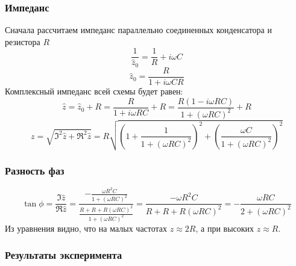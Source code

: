 \subsubsection{Импеданс}
Сначала рассчитаем импеданс параллельно соединенных конденсатора и резистора $R$
\begin{equation}
	\frac{1}{\hat{z}_0}=\frac{1}{R}+i\omega C
\end{equation}
\begin{equation}
	\hat{z}_0=\frac{R}{1+i \omega CR}
\end{equation}
Комплексный импеданс всей схемы будет равен:
\begin{equation}
	\hat{z}=\hat{z}_0+R=\frac{R}{1+i \omega RC}+R=
	\frac{R(1-i \omega RC)}{1+(\omega RC)^2}+R
\end{equation}
\begin{equation}
	z=\sqrt{\Im^2\hat{z}+\Re^2\hat{z}}=
	R\sqrt{
		\left(
		1+\frac{1}{1+(\omega RC)^2}
		\right)^2+
		\left(
		\frac{\omega C}{1+(\omega RC)^2}
		\right)^2
	}
\end{equation}

\subsubsection{Разность фаз}
\begin{equation}
	\tan\phi = \frac{\Im\hat{z}}{\Re\hat{z}}=
	\frac{
		-\frac{\omega R^2C}{1+(\omega RC)^2}
	}{
		\frac{R+R+R(\omega RC)^2}{1+(\omega RC)^2}
	}=
	\frac{
		-\omega R^2C
	}{
		R+R+R(\omega RC)^2
	}=
	-\frac{
		\omega RC
	}{
		2+(\omega RC)^2
	}
\end{equation}
Из уравнения видно, что на малых частотах $z\approx 2R$, а при высоких $z\approx R$.

\subsubsection{Результаты эксперимента}


